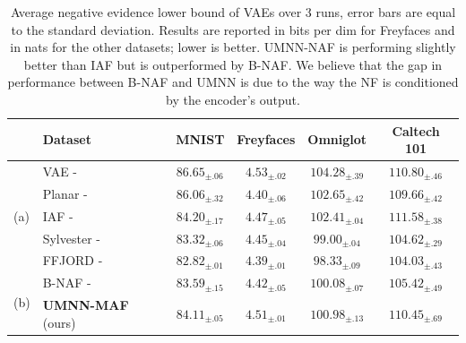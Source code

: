 \documentclass{article}
\newcommand{\tbf}[1]{\textbf{#1}}
\newcommand\mean[3]{\fp_to_decimal:n {round((#1 + #2 + #3)/3, 2)}}
\newcommand\std[3]{\fp_to_decimal:n {round(sqrt((#1^2 + #2^2 + #3^2)/3 - ((#1 + #2 + #3)/3)^2 ), 2)}}
\newcommand\meanstd[3]{$\mean{#1}{#2}{#3}_{\pm \std{#1}{#2}{#3}}$}
\begin{document}
\begin{table}
\caption{Average negative evidence lower bound of VAEs over 3 runs, error bars are equal to the standard deviation.
    Results are reported in bits per dim for Freyfaces and in nats for the other datasets; lower is better. UMNN-NAF is performing slightly better than IAF but is outperformed by B-NAF. We believe that the gap in performance between B-NAF and UMNN is due to the way the NF is conditioned by the encoder's output.}    \label{tab:vae_results}
    \centering
    \scriptsize
    \setlength{\tabcolsep}{1pt}
    \renewcommand{\arraystretch}{1.5}
    \begin{tabular}{l l c c c c}
        \hline
        &Dataset &
        \tbf{MNIST} & \tbf{Freyfaces} &\tbf{Omniglot} & \tbf{Caltech 101} \\
        \hline
        \multirow{5}{*}{(a)}
        & VAE - \cite{VAE} & $86.65_{\pm.06}$ & $4.53_{\pm.02}$ & $104.28_{\pm.39}$ & $110.80_{\pm.46}$ \\
        & Planar - \cite{NF} & $86.06_{\pm.32}$ & $4.40_{\pm.06}$ & $102.65_{\pm.42}$ & $109.66_{\pm.42}$\\
        & IAF - \cite{IAF}& $84.20_{\pm.17}$ & $4.47_{\pm.05}$ & $102.41_{\pm.04}$ & $111.58_{\pm.38}$\\
        & Sylvester - \cite{SylvesterFlow}& $83.32_{\pm.06}$ & $4.45_{\pm.04}$ & $99.00_{\pm.04}$ &
        $104.62_{\pm.29}$\\
        & FFJORD - \cite{ffjord}& $82.82_{\pm.01}$ & $4.39_{\pm.01}$ & $98.33_{\pm.09}$ & $104.03_{\pm.43}$\\ \hline
        \multirow{2}{*}{(b)}
        & B-NAF - \cite{BNAF}& $83.59_{\pm.15}$ & $4.42_{\pm.05}$ & $100.08_{\pm.07}$ & $105.42_{\pm.49}$\\
        & \tbf{UMNN-MAF} (ours)
        & $84.11_{\pm .05}$  %
        & $4.51_{\pm .01}$   %
        & $100.98_{\pm .13}$ %
        & $110.45_{\pm .69}$ %
        \\ \hline
    \end{tabular}


\end{table}
\end{document}
